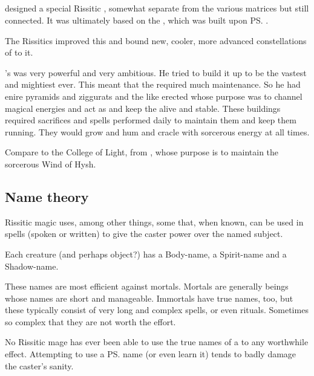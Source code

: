 \subsection{\Matrix}
\Secherdamon{} designed a special Rissitic \matrix, somewhat separate from the various \draconic{} matrices but still connected. 
It was ultimately based on the , which was built upon \ps{} . 

The Rissitics improved this \matrix{} and bound new, cooler, more advanced constellations of \daemons{} to it. 

\Secherdamon's \matrix was very powerful and very ambitious.
He tried to build it up to be the vastest and mightiest \matrix ever.
This meant that the \matrix required much maintenance.
So he had enire pyramids and ziggurats and the like erected whose purpose was to channel magical energies and act as \nexi and keep the \matrix alive and stable.
These buildings required sacrifices and spells performed daily to maintain them and keep them running.
They would grow and hum and cracle with sorcerous energy at all times.

Compare to the College of Light, from \cite{RPG:Warhammer:TheEmpire}, whose purpose is to maintain the sorcerous Wind of Hysh.










\subsection{Name theory}
Rissitic magic uses, among other things, some  that, when known, can be used in spells (spoken or written) to give the caster power over the named subject. 

Each creature (and perhaps object?) has a Body-name, a Spirit-name and a Shadow-name. 

These names are most efficient against mortals. 
Mortals are generally  beings whose names are short and manageable. 
Immortals have true names, too, but these typically consist of very long and complex spells, or even rituals. 
Sometimes so complex that they are not worth the effort. 

No Rissitic mage has ever been able to use the true names of a \bane{} to any worthwhile effect. 
Attempting to use a \ps{\bane}{} name (or even learn it) tends to badly damage the caster's sanity. 

